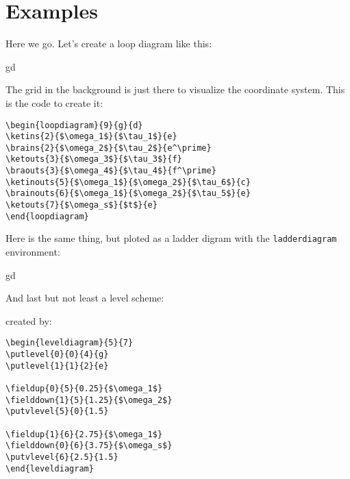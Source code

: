 \documentclass[12pt,letterpaper]{article}
\begin{document}
\section{Examples}
Here we go. Let's create a loop diagram like this:
\begin{center}
\begin{loopdiagram}{8}{g}{d}
\end{loopdiagram}
\end{center}
The grid in the background is just there to visualize the coordinate system.
This is the code to create it:
\begin{verbatim}
\begin{loopdiagram}{9}{g}{d}
\ketins{2}{$\omega_1$}{$\tau_1$}{e}
\brains{2}{$\omega_2$}{$\tau_2$}{e^\prime}
\ketouts{3}{$\omega_3$}{$\tau_3$}{f}
\braouts{3}{$\omega_4$}{$\tau_4$}{f^\prime}
\ketinouts{5}{$\omega_1$}{$\omega_2$}{$\tau_6$}{c}
\brainouts{6}{$\omega_1$}{$\omega_2$}{$\tau_5$}{e}
\ketouts{7}{$\omega_s$}{$t$}{e}
\end{loopdiagram}
\end{verbatim}

Here is the same thing, but ploted as a ladder digram with the
\verb|ladderdiagram| environment:
\begin{center}
\begin{ladderdiagram}{9}{g}{d}
\end{ladderdiagram}
\end{center}

And last but not least a level scheme:
\begin{center}
\begin{leveldiagram}{5}{7}


\end{leveldiagram}
\end{center}
created by:
\begin{verbatim}
\begin{leveldiagram}{5}{7}
\putlevel{0}{0}{4}{g}
\putlevel{1}{1}{2}{e}

\fieldup{0}{5}{0.25}{$\omega_1$}
\fielddown{1}{5}{1.25}{$\omega_2$}
\putvlevel{5}{0}{1.5}

\fieldup{1}{6}{2.75}{$\omega_1$}
\fielddown{0}{6}{3.75}{$\omega_s$}
\putvlevel{6}{2.5}{1.5}
\end{leveldiagram}
\end{verbatim}
\end{document}

